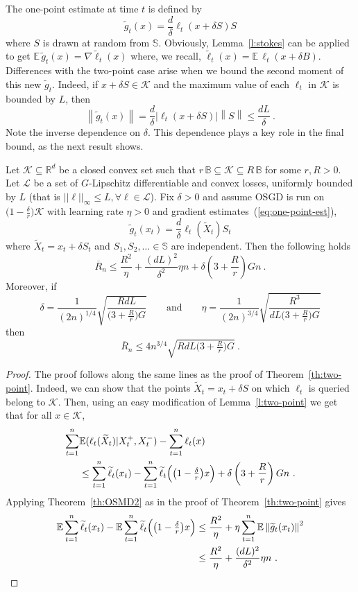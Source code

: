 \documentclass[11pt]{hackednow}
\newcommand{\E}{\mathbb{E}}
\newcommand{\R}{\mathbb{R}}
\newcommand{\cL}{\mathcal{L}}
\newcommand{\cK}{\mathcal{K}}
\newcommand{\oR}{\overline{R}}
\newcommand{\Ball}{\mathbb{B}}
\newcommand{\Sphere}{\mathbb{S}}
\newcommand{\norm}[1]{\left\|{#1}\right\|}
\newcommand{\tX}{\widetilde{X}}
\newcommand{\tloss}{\widetilde{\ell}}
\newcommand{\gtilde}{\widetilde{g}}
\begin{document}
The one-point estimate at time $t$ is defined by
\begin{equation}
\label{eq:one-point-est}
    \gtilde_t(x) = \frac{d}{\delta}\ell_t(x + \delta S)S
\end{equation}
where $S$ is drawn at random from $\Sphere$. Obviously, Lemma~\ref{l:stokes} can be applied to get
$
    \E\,\gtilde_t(x) = \nabla\tloss_t(x)
$
where, we recall, $\tloss_t(x) = \E\,\ell_t(x + \delta B)$. Differences with the two-point case arise when we bound the second moment of this new $\gtilde_t$. Indeed, if $x + \delta S \in \cK$ and the maximum value of each $\ell_t$ in $\cK$ is bounded by $L$, then
\[
    \norm{\gtilde_t(x)}
=
    \frac{d}{\delta}\bigl|\ell_t(x + \delta S)\bigr|\norm{S}
\le
    \frac{dL}{\delta}~.
\]
Note the inverse dependence on $\delta$. This dependence plays a key role in the final bound, as the next result shows.
\begin{theorem}
Let $\cK\subseteq\R^d$ be a closed convex set such that $r\,\Ball\subseteq\cK\subseteq R\,\Ball$ for some $r,R > 0$. 
Let $\cL$ be a set of $G$-Lipschitz differentiable and convex losses, uniformly bounded by $L$ (that is $||\ell||_{\infty} \leq L, \forall \ell \in \cL$). 
Fix $\delta > 0$ and assume OSGD is run on $\bigl(1-\tfrac{\delta}{r}\bigr)\cK$ with learning rate $\eta > 0$ and gradient estimates~(\ref{eq:one-point-est}),
\[
    \gtilde_t(x_t) = \frac{d}{\delta}\ell_t(\tX_t)S_t
\]
where $\tX_t = x_t + \delta S_t$ and $S_1,S_2,\dots\in\Sphere$ are independent. 
Then
the following holds
\[
\oR_n
\le
    \frac{R^2}{\eta} + \frac{(dL)^2}{\delta^2}\eta n + \delta\left(3 + \frac{R}{r} \right) G n~.
\]
Moreover, if
\[
    \delta = \frac{1}{(2n)^{1/4}}\sqrt{\frac{RdL}{\bigl(3 + \tfrac{R}{r} \bigr)G}}
\qquad\text{and}\qquad
    \eta = \frac{1}{(2n)^{3/4}}\sqrt{\frac{R^3}{dL\bigl(3 + \tfrac{R}{r} \bigr)G}}
\]
then
\[
\oR_n
\le
    4 n^{3/4}\sqrt{RdL\bigl(3 + \tfrac{R}{r} \bigr)G}~.
\]
\end{theorem}
\begin{proof}
The proof follows along the same lines as the proof of Theorem~\ref{th:two-point}. Indeed, we can show that the points $\tX_t = x_t + \delta S$ on which $\ell_t$ is queried belong to $\cK$. Then, using an easy modification of Lemma~\ref{l:two-point} we get that for all $x\in\cK$,
\begin{align*}
    \sum_{t=1}^n & \E(\ell_t(\tX_t)| X_t^+, X_t^-) - \sum_{t=1}^n \ell_t(x)
\\& \le
    \sum_{t=1}^n \tloss_t(x_t) - \sum_{t=1}^n \tloss_t\Bigl(\bigl(1-\tfrac{\delta}{r}\bigr)x\Bigr) + \delta\left(3 + \frac{R}{r} \right) G n~.
\end{align*}
Applying Theorem~\ref{th:OSMD2} as in the proof of Theorem~\ref{th:two-point} gives
\begin{align*}
    \E \sum_{t=1}^n \tloss_t(x_t) - \E \sum_{t=1}^n \tloss_t\Bigl(\bigl(1-\tfrac{\delta}{r}\bigr)x\Bigr)
& \le
    \frac{R^2}{\eta} + \eta\sum_{t=1}^n \E \norm{\gtilde_t(x_t)}^2
\\& \le
    \frac{R^2}{\eta} + \frac{(dL)^2}{\delta^2}\eta n~.
\end{align*}
\end{proof}
\end{document}
